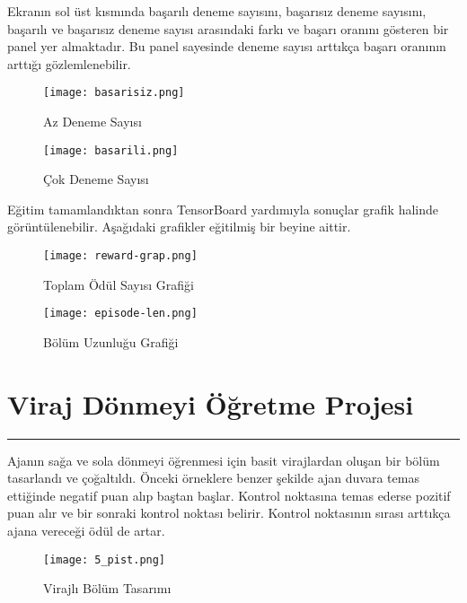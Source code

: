 \documentclass{article}
\begin{document}
\par  Ekranın sol üst kısmında başarılı deneme sayısını, başarısız deneme sayısını, başarılı ve başarısız deneme sayısı arasındaki farkı ve başarı oranını gösteren bir panel yer almaktadır. Bu panel sayesinde deneme sayısı arttıkça başarı oranının arttığı gözlemlenebilir.\\[5pt]

\begin{figure}[h]
  \centering
  \texttt{[image: basarisiz.png]}
  \caption{Az Deneme Sayısı}
\end{figure}

\begin{figure}[h]
  \centering
  \texttt{[image: basarili.png]}
  \caption{Çok Deneme Sayısı}
\end{figure}

\newpage

\par Eğitim tamamlandıktan sonra TensorBoard yardımıyla sonuçlar grafik halinde görüntülenebilir. Aşağıdaki grafikler eğitilmiş bir beyine aittir.\\[5pt]

\begin{figure}[h]
  \centering
  \texttt{[image: reward-grap.png]}
  \caption{Toplam Ödül Sayısı Grafiği}
\end{figure}

\begin{figure}[h]
  \centering
  \texttt{[image: episode-len.png]}
  \caption{Bölüm Uzunluğu Grafiği}
\end{figure}

\newpage


\section{Viraj Dönmeyi Öğretme Projesi}
\rule{\textwidth}{0.5pt}
\par Ajanın sağa ve sola dönmeyi öğrenmesi için basit virajlardan oluşan bir bölüm tasarlandı ve çoğaltıldı. Önceki örneklere benzer şekilde ajan duvara temas ettiğinde negatif puan alıp baştan başlar. Kontrol noktasına temas ederse pozitif puan alır ve bir sonraki kontrol noktası belirir. Kontrol noktasının sırası arttıkça ajana vereceği ödül de artar.  \\[5pt]

\begin{figure}[h]
    \begin{center}
        \texttt{[image: 5\_pist.png]}
    \end{center}
      \caption{Virajlı Bölüm Tasarımı \cite{sprite_shape}}
\end{figure}
\end{document}
